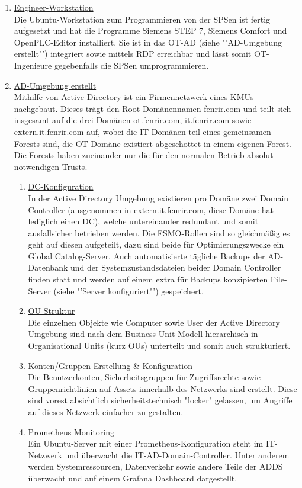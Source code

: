 \documentclass[
	headings=optiontotocandhead,%
	oneside,
	numbers=noenddot,%
	toc=flat, %
	10pt, %
	parskip=full, %
	listof=totoc, %
	listof=flat, %
	numbers=noenddot, %
	bibliography=totoc, %
	a4paper,DIV=14,
]{scrartcl}
\begin{document}
\begin{enumerate}[start=1,label={\bfseries Ziel-H \arabic*},leftmargin=*,wide]
\begin{enumerate}[label=\alph*.]
\item{\underline{Engineer-Workstation}}\\
Die Ubuntu-Workstation zum Programmieren von der SPSen ist fertig aufgesetzt und hat die Programme Siemens STEP 7, Siemens Comfort und OpenPLC-Editor installiert. Sie ist in das OT-AD (siehe "'AD-Umgebung erstellt"') integriert sowie mittels RDP erreichbar und lässt somit OT-Ingenieure gegebenfalls die SPSen umprogrammieren.

\item{\underline{AD-Umgebung erstellt}}\\
Mithilfe von Active Directory ist ein Firmennetzwerk eines KMUs nachgebaut. Dieses trägt den Root-Domänennamen fenrir.com und teilt sich insgesamt auf die drei Domänen ot.fenrir.com, it.fenrir.com sowie extern.it.fenrir.com auf, wobei die IT-Domänen teil eines gemeinsamen Forests sind, die OT-Domäne existiert abgeschottet in einem eigenen Forest. Die Forests haben zueinander nur die für den normalen Betrieb absolut notwendigen Trusts.

\begin{enumerate}[label=\roman*.]
\item{\underline{DC-Konfiguration}}\\
In der Active Directory Umgebung existieren pro Domäne zwei Domain Controller (ausgenommen in extern.it.fenrir.com, diese Domäne hat lediglich einen DC), welche untereinander redundant und somit ausfallsicher betrieben werden. Die FSMO-Rollen sind so gleichmäßig es geht auf diesen aufgeteilt, dazu sind beide für Optimierungszwecke ein Global Catalog-Server. Auch automatisierte tägliche Backups der AD-Datenbank und der Systemzustandsdateien beider Domain Controller finden statt und werden auf einem extra für Backups konzipierten File-Server (siehe "'Server konfiguriert"') gespeichert.
\item{\underline{OU-Struktur}}\\
Die einzelnen Objekte wie Computer sowie User der Active Directory Umgebung sind nach dem Business-Unit-Modell hierarchisch in Organisational Units (kurz OUs) unterteilt und somit auch strukturiert.
\item{\underline{Konten/Gruppen-Erstellung \& Konfiguration}}\\
Die Benutzerkonten, Sicherheitsgruppen für Zugriffsrechte sowie Gruppenrichtlinien auf Assets innerhalb des Netzwerks sind erstellt. Diese sind vorest absichtlich sicherheitstechnisch "locker" gelassen, um Angriffe auf dieses Netzwerk einfacher zu gestalten.
\item{\underline{Prometheus Monitoring}}\\
Ein Ubuntu-Server mit einer Prometheus-Konfiguration steht im IT-Netzwerk und überwacht die IT-AD-Domain-Controller. Unter anderem werden Systemressourcen, Datenverkehr sowie andere Teile der ADDS überwacht und auf einem Grafana Dashboard dargestellt.
\end{enumerate}


\end{enumerate}
\end{enumerate}
\end{document}

